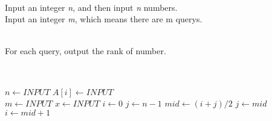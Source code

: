\documentclass{amsart}
\begin{document}
  \begin{description}
    \large
    \item[INPUT]~\\
    Input an integer \emph{n}, and then input \emph{n} numbers.\\
    Input an integer \emph{m}, which means there are m querys.\\ 
    \item[OUTPUT]~\\
    For each query, output the rank of number.\\
    
    \item[Binary Search Pseudo code]~\\
    \begin{algorithmic}[1]
      \State$n \gets INPUT$
        \State$A[i] \gets INPUT$
      \EndFor
      \\
      \State$m \gets INPUT$
        \State$x \gets INPUT$ 
        \State$i \gets 0$ 
        \State$j \gets n-1$
          \State$mid \gets (i+j)/2$
           
            \State$j \gets mid$ 
          \Else
            \State$i \gets mid+1$ 
          \EndIf
        \EndWhile
         
      \EndFor
    \end{algorithmic}
  \end{description}
\end{document}
